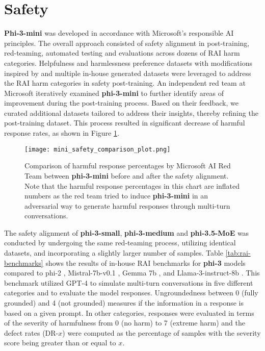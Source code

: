 \section{Safety}
\textbf{Phi-3-mini} was developed in accordance with Microsoft’s responsible AI principles. The overall approach consisted of safety alignment in post-training, red-teaming, automated testing and evaluations across dozens of RAI harm categories. Helpfulness and harmlessness preference datasets \cite{bai2022training, ji2023beavertails} with modifications inspired by \cite{bianchi2024safetytuned} and multiple in-house generated datasets were leveraged to address the RAI harm categories in safety post-training. An independent red team at Microsoft iteratively examined \textbf{phi-3-mini} to further identify areas of improvement during the post-training process. Based on their feedback, we curated additional datasets tailored to address their insights, thereby refining the post-training dataset. This process resulted in significant decrease of harmful response rates, as shown in Figure \ref{fig:safety-pt}.

\begin{figure}[h]
    \centering
    \texttt{[image: mini\_safety\_comparison\_plot.png]}
    \caption{Comparison of harmful response percentages by Microsoft AI Red Team between \textbf{phi-3-mini} before and after the safety alignment. Note that the harmful response percentages in this chart are inflated numbers as the red team tried to induce \textbf{phi-3-mini} in an adversarial way to generate harmful responses through multi-turn conversations.}
    \label{fig:safety-pt}
\end{figure}

The safety alignment of \textbf{phi-3-small}, \textbf{phi-3-medium} and \textbf{phi-3.5-MoE} was conducted by undergoing the same red-teaming process, utilizing identical datasets, and incorporating a slightly larger number of samples. Table \ref{tab:rai-benchmarks} shows the results of in-house RAI benchmarks \cite{magooda2023framework} for \textbf{phi-3} models compared to phi-2 \cite{javaheripi2023phi}, Mistral-7b-v0.1 \cite{jiang2023mistral}, Gemma 7b \cite{gemmateam2024gemma}, and Llama-3-instruct-8b \cite{llama3}. This benchmark utilized GPT-4 to simulate multi-turn conversations in five different categories and to evaluate the model responses. Ungroundedness between 0 (fully grounded) and 4 (not grounded) measures if the information in a response is based on a given prompt. In other categories, responses were evaluated in terms of the severity of harmfulness from 0 (no harm) to 7 (extreme harm) and the defect rates (DR-$x$) were computed as the percentage of samples with the severity score being greater than or equal to $x$.

